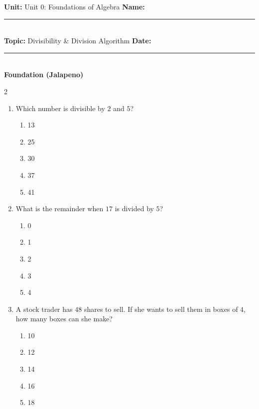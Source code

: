 \documentclass[10pt]{article}
\begin{document}
\enlargethispage{2.5cm}

\begin{tcolorbox}[colback=mainblue!5, colframe=mainblue, sharp corners, boxrule=0.5pt]
    \small \textbf{Unit:} Unit 0: Foundations of Algebra \hfill \textbf{Name:} \rule{3cm}{0.4pt} \\
    \small \textbf{Topic:} Divisibility & Division Algorithm \hfill \textbf{Date:} \rule{2cm}{0.4pt} \\
    \centering \textbf{\large Foundation (Jalapeno)}
\end{tcolorbox}

\vspace{0.2cm}

\begin{multicols}{2}
\begin{enumerate}[label=\textbf{Q\arabic*.}, leftmargin=*, itemsep=6pt, parsep=0pt]

  \item \small Which number is divisible by $2$ and $5$?
  \begin{enumerate}[label=(\Alph*), leftmargin=0.6cm, nosep, itemsep=2pt]
    \item 13
    \item 25
    \item 30
    \item 37
    \item 41
  \end{enumerate}

  \item \small What is the remainder when $17$ is divided by $5$?
  \begin{enumerate}[label=(\Alph*), leftmargin=0.6cm, nosep, itemsep=2pt]
    \item 0
    \item 1
    \item 2
    \item 3
    \item 4
  \end{enumerate}

  \item \small A stock trader has $48$ shares to sell. If she wants to sell them in boxes of $4$, how many boxes can she make?
  \begin{enumerate}[label=(\Alph*), leftmargin=0.6cm, nosep, itemsep=2pt]
    \item 10
    \item 12
    \item 14
    \item 16
    \item 18
  \end{enumerate}


\end{enumerate}
\end{multicols}
\end{document}
